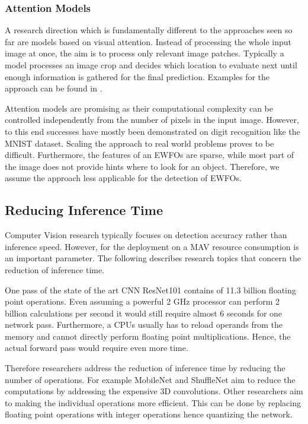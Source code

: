 \subsubsection{Attention Models}

A research direction which is fundamentally different to the approaches seen so far are models based on visual attention. Instead of processing the whole input image at once, the aim is to process only relevant image patches. Typically a model processes an image crop and decides which location to evaluate next until enough information is gathered for the final prediction. Examples for the approach can be found in \cite{Itti1998,Ba2014,Ablavatski2017a}.

Attention models are promising as their computational complexity can be controlled independently from the number of pixels in the input image. However, to this end successes have mostly been demonstrated on digit recognition like the MNIST dataset. Scaling the approach to real world problems proves to be difficult. Furthermore, the features of an \acp{EWFO} are sparse, while most part of the image does not provide hints where to look for an object. Therefore, we assume the approach less applicable for the detection of \acp{EWFO}.

\subsection{Reducing Inference Time}

Computer Vision research typically focuses on detection accuracy rather than inference speed. However, for the deployment on a \ac{MAV} resource consumption is an important parameter. The following describes research topics that concern the reduction of inference time.

One pass of the state of the art \ac{CNN} ResNet101 contains of 11.3 billion floating point operations. Even assuming a powerful 2 GHz processor can perform 2 billion calculations per second it would still require almost 6 seconds for one network pass. Furthermore, a \acp{CPU} usually has to reload operands from the memory and cannot directly perform floating point multiplications. Hence, the actual forward pass would require even more time.


Therefore researchers address the reduction of inference time by reducing the number of operations. For example MobileNet and ShuffleNet aim to reduce the computations by addressing the expensive 3D convolutions. Other researchers aim to making the individual operations more efficient. This can be done by replacing floating point operations with integer operations hence quantizing the network.

